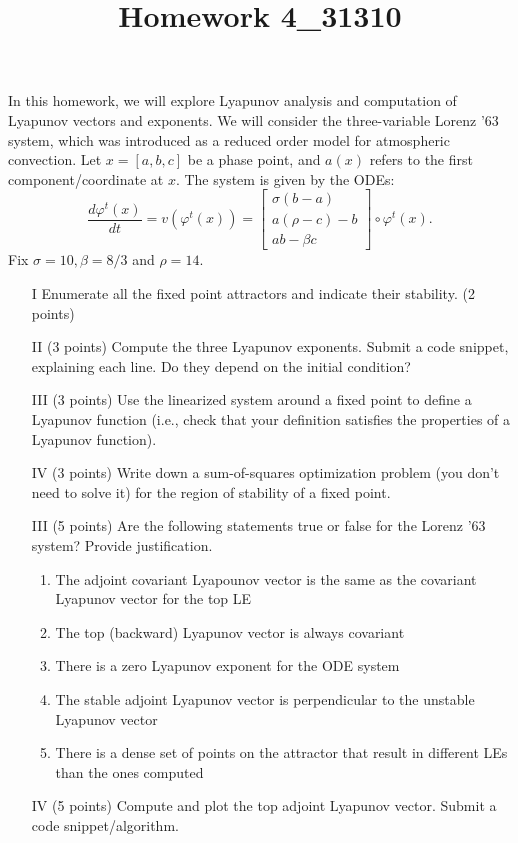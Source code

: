 \documentclass[12pt]{article}
\title{Homework 4_31310}
\begin{document}
\MakeScribeTop
In this homework, we will explore Lyapunov analysis and computation of Lyapunov vectors and exponents. We will consider the three-variable Lorenz '63 system, which was introduced as a reduced order model for atmospheric convection. Let $x = [a,b,c]$ be a phase point, and $a(x)$ refers to the first component/coordinate at $x.$ 
The system is given by the ODEs:
\begin{equation}
	\dfrac{d\varphi^t(x)}{dt} = v(\varphi^t(x)) = 
    \begin{bmatrix}
	\sigma(b - a) \\
	a(\rho - c) - b \\
	ab  - \beta c
	\end{bmatrix} \circ \varphi^t(x).
\end{equation}
Fix $\sigma = 10, \beta = 8/3$ and $\rho = 14$. 
\begin{enumerate}
	\item[I] Enumerate all the fixed point attractors and indicate their stability. (2 points) 
	\item[II] (3 points) Compute the three Lyapunov exponents. Submit a code snippet, explaining each line. Do they depend on the initial condition?
    \item[III] (3 points) Use the linearized system around a fixed point to define a Lyapunov function (i.e., check that your definition satisfies the properties of a Lyapunov function).
    \item[IV] (3 points) Write down a sum-of-squares optimization problem (you don't need to solve it) for the region of stability of a fixed point.  
	\item[III] (5 points) Are the following statements true or false for the Lorenz '63 system? Provide justification.
		\begin{enumerate}
			\item The adjoint covariant Lyapounov vector is the same as the covariant Lyapunov vector for the top LE
			\item The top (backward) Lyapunov vector is always covariant
			\item There is a zero Lyapunov exponent for the ODE system
			\item The stable adjoint Lyapunov vector is perpendicular to the unstable Lyapunov vector 
			\item There is a dense set of points on the attractor that result in different LEs than the ones computed
		\end{enumerate}
	\item[IV] (5 points) Compute and plot the top adjoint Lyapunov vector. Submit a code snippet/algorithm.

\end{enumerate} 
\end{document}
